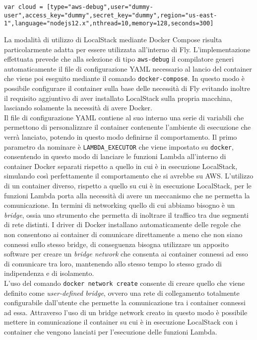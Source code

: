 \begin{lstlisting}[language=FLY,caption={Dichiarazione di un ambiente aws-debug}, label={lst:debugDichiarazione}]
var cloud = [type="aws-debug",user="dummy-user",access_key="dummy",secret_key="dummy",region="us-east-1",language="nodejs12.x",nthread=10,memory=128,seconds=300]
\end{lstlisting}

La modalità di utilizzo di LocalStack mediante Docker Compose risulta particolarmente adatta per essere utilizzata all'interno di Fly. L'implementazione effettuata prevede che alla selezione di tipo \verb|aws-debug| il compilatore generi automaticamente il file di configurazione YAML necessario al lancio del container che viene poi eseguito mediante il comando \verb|docker-compose|. In questo modo è possibile configurare il container sulla base delle necessità di Fly evitando inoltre il requisito aggiuntivo di aver installato LocalStack sulla propria macchina, lasciando solamente la necessità di avere Docker. \\
Il file di configurazione YAML contiene al suo interno una serie di variabili che permettono di personalizzare il container contenente l'ambiente di esecuzione che verrà lanciato, potendo in questo modo definirne il comportamento. Il primo parametro da nominare è \verb|LAMBDA_EXECUTOR| che viene impostato su \verb|docker|, consentendo in questo modo di lanciare le funzioni Lambda all’interno di container Docker separati rispetto a quello in cui è in esecuzione LocalStack, simulando così perfettamente il comportamento che si avrebbe su AWS. L’utilizzo di un container diverso, rispetto a quello su cui è in esecuzione LocalStack, per le funzioni Lambda porta alla necessità di avere un meccanismo che ne permetta la comunicazione. In termini di networking quello di cui abbiamo bisogno è un \textit{bridge}, ossia uno strumento che permetta di inoltrare il traffico tra due segmenti di rete distinti. I driver di Docker installano automaticamente delle regole che non consentono ai container di comunicare direttamente a meno che non siano connessi sullo stesso bridge, di conseguenza bisogna utilizzare un apposito software per creare un \textit{bridge network} che consenta ai container connessi ad esso di comunicare tra loro, mantenendo allo stesso tempo lo stesso grado di indipendenza e di isolamento. \\
L’uso del comando \verb|docker network create| consente di creare quello che viene definito come \textit{user-defined bridge}, ovvero una rete di collegamento totalmente configurabile dall’utente che permette la comunicazione tra i container connessi ad essa. Attraverso l’uso di un bridge network creato in questo modo è possibile mettere in comunicazione il container su cui è in esecuzione LocalStack con i container che vengono lanciati per l’esecuzione delle funzioni Lambda.\\

